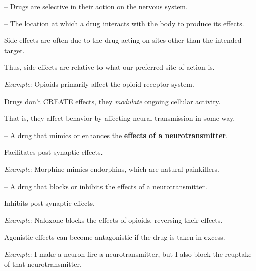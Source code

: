 \begin{coloredlist}
    \item {} -- Drugs are selective in their action on the nervous system.
    \begin{coloredlist}
        \item {} -- The location at which a drug interacts with the body to produce its effects.
        \item Side effects are often due to the drug acting on sites other than the intended target.
        \begin{coloredlist}
            \item Thus, side effects are relative to what our preferred site of action is.
        \end{coloredlist}
        \item \textit{Example}: Opioids primarily affect the opioid receptor system.
    \end{coloredlist}
    \item Drugs don't CREATE effects, they \textit{modulate} ongoing cellular activity.
    \begin{coloredlist}
        \item That is, they affect behavior by affecting neural transmission in some way.
        \item {} -- A drug that mimics or enhances the \textbf{effects of a neurotransmitter}.
        \begin{coloredlist}
            \item Facilitates post synaptic effects.
            \item \textit{Example}: Morphine mimics endorphins, which are natural painkillers.
        \end{coloredlist}
        \item {} -- A drug that blocks or inhibits the effects of a neurotransmitter.
        \begin{coloredlist}
            \item Inhibits post synaptic effects.
            \item \textit{Example}: Naloxone blocks the effects of opioids, reversing their effects.
        \end{coloredlist}
        \item Agonistic effects can become antagonistic if the drug is taken in excess.
        \begin{coloredlist}
            \item \textit{Example}: I make a neuron fire a neurotransmitter, but I also block the reuptake of that neurotransmitter.
        \end{coloredlist}
    \end{coloredlist}
\end{coloredlist}

